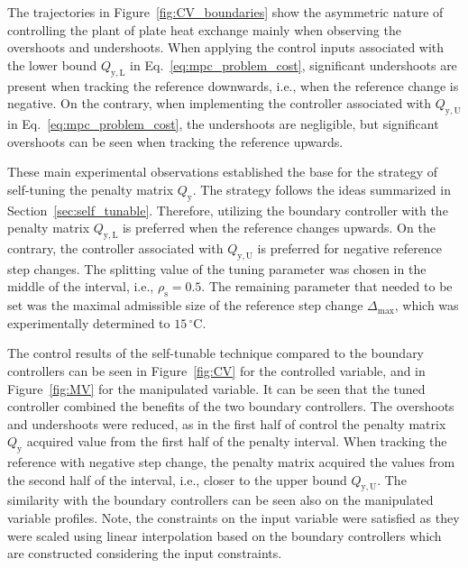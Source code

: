 \documentclass[preprint,12pt]{elsarticle}
\begin{document}
	The trajectories in Figure~\ref{fig:CV_boundaries} show the asymmetric nature of controlling the plant of plate heat exchange mainly when observing the overshoots and undershoots. When applying the control inputs associated with the lower bound $Q_\mathrm{y, L}$ in Eq.~\eqref{eq:mpc_problem_cost}, significant undershoots are present when tracking the reference downwards, i.e., when the reference change is negative. On the contrary, when implementing the controller associated with $Q_\mathrm{y, U}$ in Eq.~\eqref{eq:mpc_problem_cost}, the undershoots are negligible, but significant overshoots can be seen when tracking the reference upwards.
	
	These main experimental observations established the base for the strategy of self-tuning the penalty matrix $Q_\mathrm{y}$. The strategy follows the ideas summarized in Section~\ref{sec:self_tunable}. Therefore, utilizing the boundary controller with the penalty matrix $Q_\mathrm{y,L}$ is preferred when the reference changes upwards. On the contrary, the controller associated with $Q_\mathrm{y,U}$ is preferred for negative reference step changes. The splitting value of the tuning parameter was chosen in the middle of the interval, i.e., $\rho_{\mathrm{s}} = 0.5$. The remaining parameter that needed to be set was the maximal admissible size of the reference step change $\Delta_{\max}$, which was experimentally determined to $15\,^{\circ}\mathrm{C}$. 
	
	The control results of the self-tunable technique compared to the boundary controllers can be seen in Figure~\ref{fig:CV} for the controlled variable, and in Figure~\ref{fig:MV} for the manipulated variable. It can be seen that the tuned controller combined the benefits of the two boundary controllers. The overshoots and undershoots were reduced, as in the first half of control the penalty matrix $Q_\mathrm{y}$ acquired value from the first half of the penalty interval. When tracking the reference with negative step change, the penalty matrix acquired the values from the second half of the interval, i.e., closer to the upper bound $Q_\mathrm{y,U}$. 
	The similarity with the boundary controllers can be seen also on the manipulated variable profiles. Note, the constraints on the input variable were satisfied as they were scaled using linear interpolation based on the boundary controllers which are constructed considering the input constraints. 
	
\end{document}
